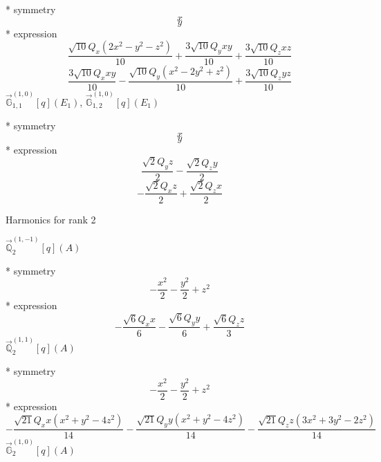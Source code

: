 \documentclass[fleqn,8pt]{jsarticle}
\begin{document}
\noindent\quad ** symmetry
\begin{dmath*}
x
\end{dmath*}
\begin{dmath*}
y
\end{dmath*}
\noindent\quad ** expression
\begin{dmath*}
\frac{\sqrt{10} Q_{x} \left(2 x^{2} - y^{2} - z^{2}\right)}{10} + \frac{3 \sqrt{10} Q_{y} x y}{10} + \frac{3 \sqrt{10} Q_{z} x z}{10}
\end{dmath*}
\begin{dmath*}
\frac{3 \sqrt{10} Q_{x} x y}{10} - \frac{\sqrt{10} Q_{y} \left(x^{2} - 2 y^{2} + z^{2}\right)}{10} + \frac{3 \sqrt{10} Q_{z} y z}{10}
\end{dmath*}
\noindent\quad $\vec{\mathbb{G}}_{1,1}^{(1,0)}[q](E_{1})$, $\vec{\mathbb{G}}_{1,2}^{(1,0)}[q](E_{1})$

\noindent\quad ** symmetry
\begin{dmath*}
x
\end{dmath*}
\begin{dmath*}
y
\end{dmath*}
\noindent\quad ** expression
\begin{dmath*}
\frac{\sqrt{2} Q_{y} z}{2} - \frac{\sqrt{2} Q_{z} y}{2}
\end{dmath*}
\begin{dmath*}
- \frac{\sqrt{2} Q_{x} z}{2} + \frac{\sqrt{2} Q_{z} x}{2}
\end{dmath*}

\noindent * Harmonics for rank 2

\noindent\quad $\vec{\mathbb{Q}}_{2}^{(1,-1)}[q](A)$

\noindent\quad ** symmetry
\begin{dmath*}
- \frac{x^{2}}{2} - \frac{y^{2}}{2} + z^{2}
\end{dmath*}
\noindent\quad ** expression
\begin{dmath*}
- \frac{\sqrt{6} Q_{x} x}{6} - \frac{\sqrt{6} Q_{y} y}{6} + \frac{\sqrt{6} Q_{z} z}{3}
\end{dmath*}
\noindent\quad $\vec{\mathbb{Q}}_{2}^{(1,1)}[q](A)$

\noindent\quad ** symmetry
\begin{dmath*}
- \frac{x^{2}}{2} - \frac{y^{2}}{2} + z^{2}
\end{dmath*}
\noindent\quad ** expression
\begin{dmath*}
- \frac{\sqrt{21} Q_{x} x \left(x^{2} + y^{2} - 4 z^{2}\right)}{14} - \frac{\sqrt{21} Q_{y} y \left(x^{2} + y^{2} - 4 z^{2}\right)}{14} - \frac{\sqrt{21} Q_{z} z \left(3 x^{2} + 3 y^{2} - 2 z^{2}\right)}{14}
\end{dmath*}
\noindent\quad $\vec{\mathbb{G}}_{2}^{(1,0)}[q](A)$
\end{document}
